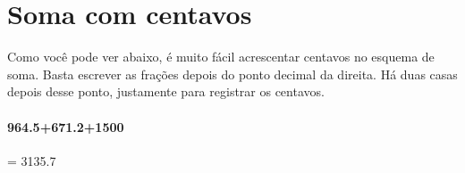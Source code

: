 \documentclass[12pt]{book}
\begin{document}
\vspace{0.2cm}
\begin{minipage}{0.3\textwidth}
\end{minipage}%
%
\begin{minipage}{0.3\textwidth}
\end{minipage}%
%
\begin{minipage}{0.3\textwidth}
\end{minipage}

\section{Soma com centavos}
Como você pode ver abaixo, é muito fácil acrescentar centavos
no esquema de soma. Basta escrever as frações depois
do ponto decimal da direita. Há duas casas depois
desse ponto, justamente para registrar os centavos.

\paragraph{964.5+671.2+1500}= 3135.7\\
\end{document}
